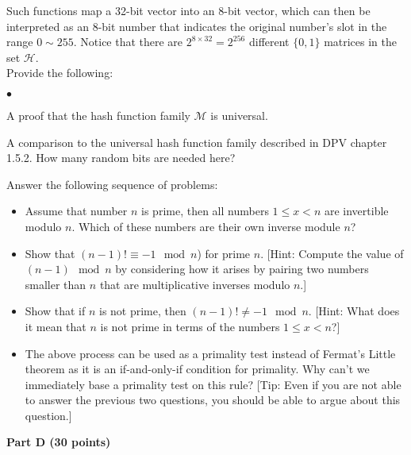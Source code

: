 \documentclass{article}
\newenvironment{myitem}{\begin{list}{$\bullet$}
{\setlength{\itemsep}{-0pt}
\setlength{\topsep}{0pt}
\setlength{\labelwidth}{0pt}
\setlength{\leftmargin}{10pt}
\setlength{\parsep}{-0pt}
\setlength{\itemsep}{0pt}
\setlength{\partopsep}{0pt}}}%
{\end{list}}
\begin{document}
\noindent Such functions map a 32-bit vector into an 8-bit vector,
which can then be interpreted as an 8-bit number that indicates the
original number's slot in the range $0 \sim 255$. Notice that there
are $2^{8\times32}=2^{256}$ different $\{0,1\}$ matrices in the set
$\mathcal{H}$.\\

\noindent Provide the following:
\begin{myitem}
\item A proof that the hash function family $\mathcal{M}$ is
  universal.

\item A comparison to the universal hash function family described in
  DPV chapter 1.5.2. How many random bits are needed here?\\
\end{myitem}

\newpage

 Answer the following sequence of problems:
\begin{itemize}

\item Assume that number $n$ is prime, then all numbers $1 \leq x < n$
  are invertible modulo $n$. Which of these numbers are their own
  inverse module $n$?

\item Show that $(n-1)! \equiv -1 \mod n$) for prime $n$. [Hint:
  Compute the value of $(n-1) \mod n$ by considering how it arises by
  pairing two numbers smaller than $n$ that are multiplicative
  inverses modulo $n$.]

\item Show that if $n$ is not prime, then $(n-1)! \neq -1 \mod
  n$. [Hint: What does it mean that $n$ is not prime in terms of the
    numbers $1 \leq x < n$?]

\item The above process can be used as a primality test instead of
  Fermat's Little theorem as it is an if-and-only-if condition for
  primality. Why can't we immediately base a primality test on this
  rule? [Tip: Even if you are not able to answer the previous two
    questions, you should be able to argue about this question.]\\

\end{itemize}

\begin{center}
{\bf Part D (30 points)}
\end{center}
\end{document}
